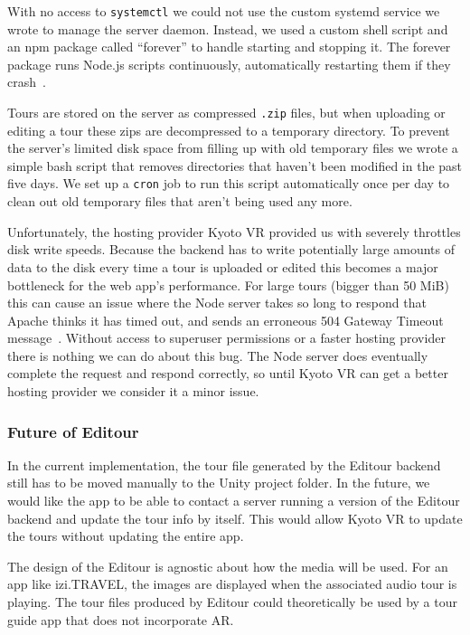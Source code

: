 \documentclass[a4paper, 10pt, american, titlepage]{article}
\begin{document}
With no access to \texttt{systemctl} we could not use the custom systemd service
we wrote to manage the server daemon. Instead, we used a custom shell script and
an npm package called ``forever'' to handle starting and stopping it. The
forever package runs Node.js scripts continuously, automatically restarting them
if they crash~\autocite{robbins2019}.

Tours are stored on the server as compressed \texttt{.zip} files, but when
uploading or editing a tour these zips are decompressed to a temporary
directory. To prevent the server's limited disk space from filling up with old
temporary files we wrote a simple bash script that removes directories that
haven't been modified in the past five days. We set up a \texttt{cron} job to
run this script automatically once per day to clean out old temporary files that
aren't being used any more.

Unfortunately, the hosting provider Kyoto VR provided us with severely throttles
disk write speeds. Because the backend has to write potentially large amounts of
data to the disk every time a tour is uploaded or edited this becomes a major
bottleneck for the web app's performance. For large tours (bigger than 50 MiB)
this can cause an issue where the Node server takes so long to respond that
Apache thinks it has timed out, and sends an erroneous 504 Gateway Timeout
message~\autocite{rfc7231}. Without access to superuser permissions or a faster
hosting provider there is nothing we can do about this bug. The Node server does
eventually complete the request and respond correctly, so until Kyoto VR can get
a better hosting provider we consider it a minor issue.

\subsubsection{Future of Editour}
\label{sec:futureOfEditour}

In the current implementation, the tour file generated by the Editour backend
still has to be moved manually to the Unity project folder. In the future, we
would like the app to be able to contact a server running a version of the
Editour backend and update the tour info by itself. This would allow Kyoto VR
to update the tours without updating the entire app.

The design of the Editour is agnostic about how the media will be used. For an
app like izi.TRAVEL, the images are displayed when the associated audio tour is
playing. The tour files produced by Editour could theoretically be used by a
tour guide app that does not incorporate AR.
\end{document}
